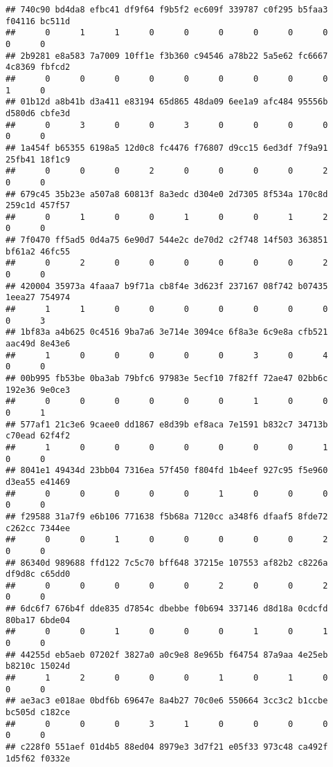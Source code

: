 \documentclass[
]{article}
\begin{document}
\begin{verbatim}
## 740c90 bd4da8 efbc41 df9f64 f9b5f2 ec609f 339787 c0f295 b5faa3 f04116 bc511d 
##      0      1      1      0      0      0      0      0      0      0      0 
## 2b9281 e8a583 7a7009 10ff1e f3b360 c94546 a78b22 5a5e62 fc6667 4c8369 fbfcd2 
##      0      0      0      0      0      0      0      0      0      1      0 
## 01b12d a8b41b d3a411 e83194 65d865 48da09 6ee1a9 afc484 95556b d580d6 cbfe3d 
##      0      3      0      0      3      0      0      0      0      0      0 
## 1a454f b65355 6198a5 12d0c8 fc4476 f76807 d9cc15 6ed3df 7f9a91 25fb41 18f1c9 
##      0      0      0      2      0      0      0      0      2      0      0 
## 679c45 35b23e a507a8 60813f 8a3edc d304e0 2d7305 8f534a 170c8d 259c1d 457f57 
##      0      1      0      0      1      0      0      1      2      0      0 
## 7f0470 ff5ad5 0d4a75 6e90d7 544e2c de70d2 c2f748 14f503 363851 bf61a2 46fc55 
##      0      2      0      0      0      0      0      0      2      0      0 
## 420004 35973a 4faaa7 b9f71a cb8f4e 3d623f 237167 08f742 b07435 1eea27 754974 
##      1      1      0      0      0      0      0      0      0      0      3 
## 1bf83a a4b625 0c4516 9ba7a6 3e714e 3094ce 6f8a3e 6c9e8a cfb521 aac49d 8e43e6 
##      1      0      0      0      0      0      3      0      4      0      0 
## 00b995 fb53be 0ba3ab 79bfc6 97983e 5ecf10 7f82ff 72ae47 02bb6c 192e36 9e0ce3 
##      0      0      0      0      0      0      1      0      0      0      1 
## 577af1 21c3e6 9caee0 dd1867 e8d39b ef8aca 7e1591 b832c7 34713b c70ead 62f4f2 
##      1      0      0      0      0      0      0      0      1      0      0 
## 8041e1 49434d 23bb04 7316ea 57f450 f804fd 1b4eef 927c95 f5e960 d3ea55 e41469 
##      0      0      0      0      0      1      0      0      0      0      0 
## f29588 31a7f9 e6b106 771638 f5b68a 7120cc a348f6 dfaaf5 8fde72 c262cc 7344ee 
##      0      0      1      0      0      0      0      0      2      0      0 
## 86340d 989688 ffd122 7c5c70 bff648 37215e 107553 af82b2 c8226a df9d8c c65dd0 
##      0      0      0      0      0      2      0      0      2      0      0 
## 6dc6f7 676b4f dde835 d7854c dbebbe f0b694 337146 d8d18a 0cdcfd 80ba17 6bde04 
##      0      0      1      0      0      0      1      0      1      0      0 
## 44255d eb5aeb 07202f 3827a0 a0c9e8 8e965b f64754 87a9aa 4e25eb b8210c 15024d 
##      1      2      0      0      0      1      0      1      0      0      0 
## ae3ac3 e018ae 0bdf6b 69647e 8a4b27 70c0e6 550664 3cc3c2 b1ccbe bc505d c182ce 
##      0      0      0      3      1      0      0      0      0      0      0 
## c228f0 551aef 01d4b5 88ed04 8979e3 3d7f21 e05f33 973c48 ca492f 1d5f62 f0332e 

\end{verbatim}
\end{document}
